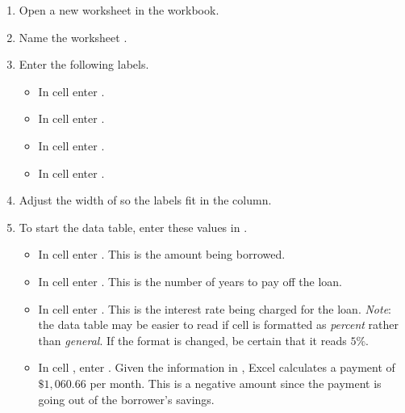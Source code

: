 \begin{enumerate}
	\item Open a new worksheet in the  workbook.
	\item Name the worksheet .
	\item Enter the following labels.
	
	\begin{itemize}
		\item In cell  enter .
		\item In cell  enter .
		\item In cell  enter .
		\item In cell  enter .
	\end{itemize}

	\item Adjust the width of  so the labels fit in the column.
	\item To start the data table, enter these values in .
	
	\begin{itemize}
		\item In cell  enter . This is the amount being borrowed.
		\item In cell  enter . This is the number of years to pay off the loan.
		\item In cell  enter . This is the interest rate being charged for the loan. \textit{Note}: the data table may be easier to read if cell  is formatted as \textit{percent} rather than \textit{general}. If the format is changed, be certain that it reads $ 5\% $.
		\item In cell , enter . Given the information in , Excel calculates a payment of $ \$1,060.66 $ per month. This is a negative amount since the payment is going out of the borrower's savings.
	\end{itemize}


\end{enumerate}
